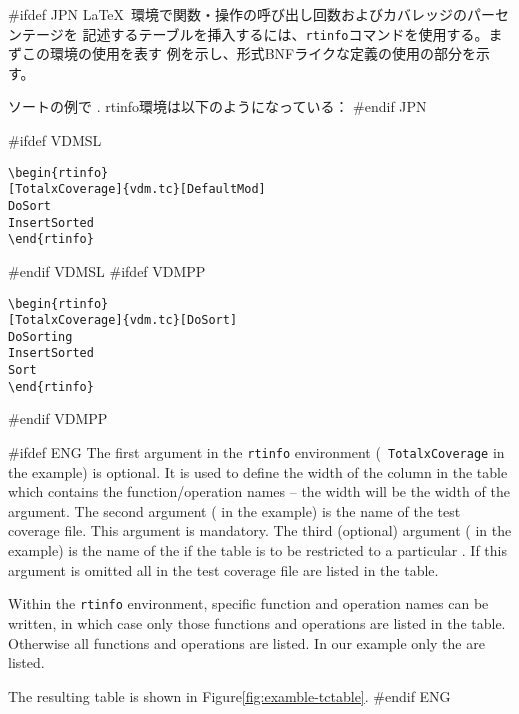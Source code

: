 \documentclass[\pformat,12pt]{article}
\begin{document}
#ifdef JPN
\LaTeX\ 環境で関数・操作の呼び出し回数およびカバレッジのパーセンテージを
記述するテーブルを挿入するには、{\tt rtinfo}コマンドを使用する。まずこの環境の使用を表す
例を示し、形式BNFライクな定義の使用の部分を示す。
  
ソートの例で
.
rtinfo環境は以下のようになっている：
#endif JPN

#ifdef VDMSL
\begin{verbatim}
\begin{rtinfo}
[TotalxCoverage]{vdm.tc}[DefaultMod]
DoSort
InsertSorted
\end{rtinfo}
\end{verbatim}
#endif VDMSL
#ifdef VDMPP
\begin{verbatim}
\begin{rtinfo}
[TotalxCoverage]{vdm.tc}[DoSort]
DoSorting
InsertSorted
Sort
\end{rtinfo}
\end{verbatim}
#endif VDMPP

#ifdef ENG
The first argument in the {\tt rtinfo} environment ({\tt
  TotalxCoverage} in the example) is optional. 
It is used to define the width of the column in the table which
contains the function/operation names -- the width will be the width
of the argument.  The second argument
( in the example) is the  
name of the test coverage file.  This argument is mandatory.  The third
(optional) argument ( in the example) is the name of the
 if the table is to be
restricted to a  particular
. If this argument is
omitted all  in the test
coverage file are listed in the table.

Within the {\tt rtinfo} environment, specific function and
operation names can be written, in which case only those
functions and operations are listed in the table. Otherwise all
functions and operations are listed.  In our example only the 
 are listed.

The resulting table is shown in Figure\ref{fig:examble-tctable}.
#endif ENG
\end{document}
